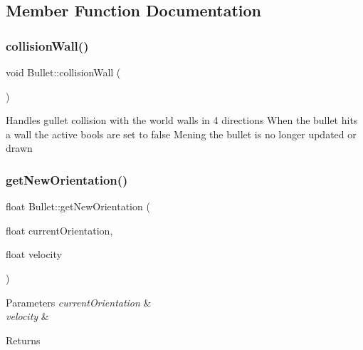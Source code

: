 \subsection{Member Function Documentation}
\mbox{\label{class_bullet_a4315a4cef5fc227efbd64a099ac748fb}} 
\subsubsection{\texorpdfstring{collisionWall()}{collisionWall()}}
{\footnotesize\ttfamily void Bullet\+::collision\+Wall (\begin{DoxyParamCaption}{ }\end{DoxyParamCaption})}



Handles gullet collision with the world walls in 4 directions When the bullet hits a wall the active bools are set to false Mening the bullet is no longer updated or drawn 

\mbox{\label{class_bullet_a60bd50aace6a584421fe9012ff45aa4e}} 
\subsubsection{\texorpdfstring{getNewOrientation()}{getNewOrientation()}}
{\footnotesize\ttfamily float Bullet\+::get\+New\+Orientation (\begin{DoxyParamCaption}\item[{float}]{current\+Orientation,  }\item[{float}]{velocity }\end{DoxyParamCaption})\hspace{0.3cm}{\ttfamily [private]}}






\begin{DoxyParams}{Parameters}
{\em current\+Orientation} & \\
\hline
{\em velocity} & \\
\hline
\end{DoxyParams}
\begin{DoxyReturn}{Returns}

\end{DoxyReturn}
\mbox{\label{class_bullet_a64e4ce634f62ab31d338bd142c1987c9}} 
